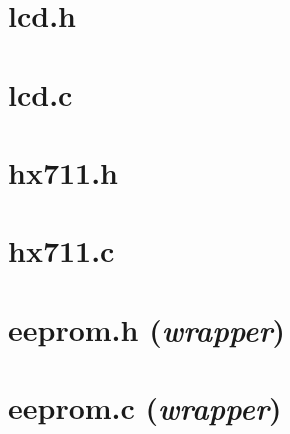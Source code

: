 {	\section*{lcd.h}
	\label{anexo-lcd-h}
	
	\newpage
	\section*{lcd.c}
	\label{anexo-lcd-c}
	
	\newpage
	\section*{hx711.h}
	\label{anexo-hx711-h}
	
	\newpage
	\section*{hx711.c}
	\label{anexo-hx711-c}
	
	\newpage
	\section*{eeprom.h (\textit{wrapper})}
	\label{anexo-eeprom-h}
	
	\newpage
	\section*{eeprom.c (\textit{wrapper})}
	\label{anexo-eeprom-c}
	
}
\restoregeometry
